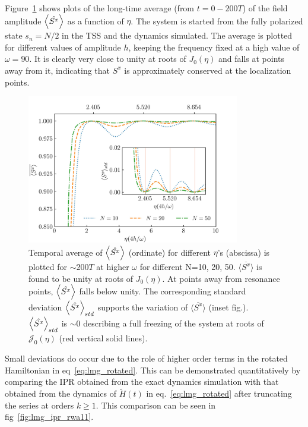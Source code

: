 \documentclass[%
reprint,
superscriptaddress,
linenumbers,
amsmath,amssymb,
aps,
prb,
showkeys,
]{revtex4-2}
\begin{document}
	Figure~\ref{fig:sx_conserve} shows plots of the long-time average (from $t=0-200T$) of the field amplitude $\expval{\hat{S^x}}$ as a function of $\eta$. The system is started from the fully polarized state $s_n=N/2$ in the TSS and the dynamics simulated. The average is plotted for different values of amplitude $h$, keeping the frequency fixed at a high value of $\omega=90$. It is clearly very close to unity at roots of $J_0(\eta)$ and falls at points away from it, indicating that $S^x$ is approximately conserved at the localization points.
	
	\begin{figure}[t!]
		\centering
		\includegraphics[width=9.3cm]{sx_conservation.jpeg }
		\caption{Temporal average of $\expval{\hat{S^x}}$ (ordinate) for different $\eta$'s (abscissa) is plotted for $\sim 200T$ at higher $\omega$ for different N=10, 20, 50. $\overline{\langle S^x \rangle}$ is found to be unity at roots of $J_0(\eta)$. At points away from resonance points, $\expval{\hat{S^x}}$ falls below unity. The corresponding standard deviation $\expval{\hat{S^x}}_{std}$ supports the variation of $\overline{\langle S^x \rangle}$ (inset fig.). $\expval{\hat{S^x}}_{std}$ is $\sim 0$ describing a full freezing of the system at roots of $\mathcal{J}_0(\eta)$ (red vertical solid lines).}
		\label{fig:sx_conserve}
	\end{figure}
	Small deviations do occur due to the role of  higher order terms in the rotated Hamiltonian in eq~\ref{eq:lmg_rotated}. This can be demonstrated quantitatively by comparing the IPR obtained from the exact dynamics simulation with that obtained from the dynamics of $\tilde{H}(t)$ in eq.~\ref{eq:lmg_rotated} after truncating the series at orders $k\geq 1$. This comparison can be seen in fig~\ref{fig:lmg_ipr_rwa11}.
\end{document}
